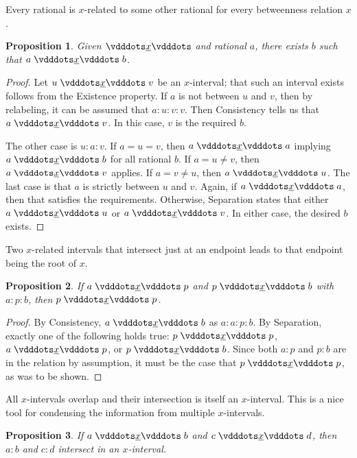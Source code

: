 \documentclass[12pt]{article}
\newtheorem{proposition}{Proposition}[section]
\begin{document}
Every rational is $x$-related to some other rational for every betweenness relation $x$. 

\begin{proposition}\label{br:existence}
    Given $\xrel$ and rational $a$, there exists $b$ such that $a \xrel b$. 
\end{proposition}

\begin{proof}
    Let $u \xrel v$ be an $x$-interval; that such an interval exists follows from the Existence property. If $a$ is not between $u$ and $v$, then by relabeling, it can be assumed that $a:u:v:v$. Then Consistency tells us that $a \xrel v$. In this case, $v$ is the required $b$. 

    The other case is $u:a:v$. If $a = u = v$, then $a \xrel a$ implying $a \xrel b$ for all rational $b$.  If $a = u \neq v$, then $a \xrel v$ applies. If $a  = v \neq u$, then $a \xrel u$. The last case is that $a$ is strictly between $u$ and $v$. Again, if $a \xrel a$, then that satisfies the requirements. Otherwise, Separation states that either $a \xrel u$ or $a \xrel v$. In either case, the desired $b$ exists. 
\end{proof}

Two $x$-related intervals that intersect just at an endpoint leads to that endpoint being the root of $x$. 

\begin{proposition}\label{br:endpointed}
    If $a \xrel p$ and $p \xrel b$ with $a:p:b$, then $p \xrel p$.
\end{proposition}

\begin{proof}
    By Consistency, $a \xrel b$ as $a:a:p:b$.  By Separation, exactly one of the following holds true: $p \xrel p$,  \sout{$a \xrel p$}, or \sout{$p \xrel b$}. Since both $a:p$ and $p:b$ are in the relation by assumption, it must be the case that $p \xrel p$, as was to be shown. 
\end{proof}

All $x$-intervals overlap and their intersection is itself an $x$-interval. This is a nice tool for condensing the information from multiple $x$-intervals. 

\begin{proposition}\label{br:intersect}
    If $a \xrel b$ and $c \xrel d$, then $a:b$ and $c:d$ intersect in an $x$-interval. 
\end{proposition}
\end{document}
